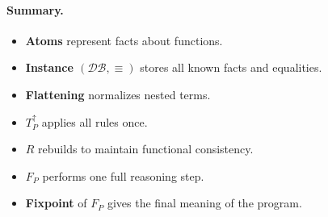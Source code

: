 \documentclass[acmsmall,screen, nonacm, anonymous]{acmart}
\newcommand{\DB}{\mathcal{DB}}               %
\begin{document}
\paragraph{Summary.}
\begin{itemize}
  \item \textbf{Atoms} represent facts about functions.
  \item \textbf{Instance $(\DB,\equiv)$} stores all known facts and equalities.
  \item \textbf{Flattening} normalizes nested terms.
  \item \textbf{$T_P^\uparrow$} applies all rules once.
  \item \textbf{$R$} rebuilds to maintain functional consistency.
  \item \textbf{$F_P$} performs one full reasoning step.
  \item \textbf{Fixpoint} of $F_P$ gives the final meaning of the program.
\end{itemize}





\end{document}
